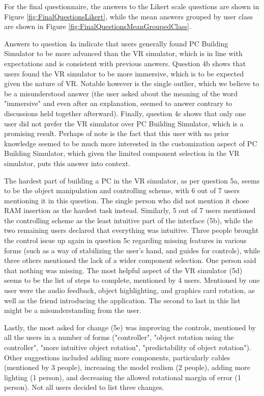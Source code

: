 For the final questionnaire, the answers to the Likert scale questions are shown in Figure \ref{fig:FinalQuestionsLikert}, while the mean answers grouped by user class are shown in Figure \ref{fig:FinalQuestionsMeanGroupedClass}.

Answers to question 4a indicate that users generally found PC Building Simulator to be more advanced than the VR simulator, which is in line with expectations and is consistent with previous answers.
Question 4b shows that users found the VR simulator to be more immersive, which is to be expected given the nature of VR.
Notable however is the single outlier, which we believe to be a misunderstood answer (the user asked about the meaning of the word "immersive" and even after an explanation, seemed to answer contrary to discussions held together afterward).
Finally, question 4c shows that only one user did not prefer the VR simulator over PC Building Simulator, which is a promising result.
Perhaps of note is the fact that this user with no prior knowledge seemed to be much more interested in the customization aspect of PC Building Simulator, which given the limited component selection in the VR simulator, puts this answer into context.

The hardest part of building a PC in the VR simulator, as per question 5a, seems to be the object manipulation and controlling scheme, with 6 out of 7 users mentioning it in this question.
The single person who did not mention it chose RAM insertion as the hardest task instead.
Similarly, 5 out of 7 users mentioned the controlling scheme as the least intuitive part of the interface (5b), while the two remaining users declared that everything was intuitive.
Three people brought the control issue up again in question 5c regarding missing features in various forms (such as a way of stabilizing the user's hand, and guides for controls), while three others mentioned the lack of a wider component selection.
One person said that nothing was missing.
The most helpful aspect of the VR simulator (5d) seems to be the list of steps to complete, mentioned by 4 users.
Mentioned by one user were the audio feedback, object highlighting, and graphics card rotation, as well as the friend introducing the application.
The second to last in this list might be a misunderstanding from the user.

Lastly, the most asked for change (5e) was improving the controls, mentioned by all the users in a number of forms ("controller", "object rotation using the controller", "more intuitive object rotation", "predictability of object rotation").
Other suggestions included adding more components, particularly cables (mentioned by 3 people), increasing the model realism (2 people), adding more lighting (1 person), and decreasing the allowed rotational margin of error (1 person).
Not all users decided to list three changes.

